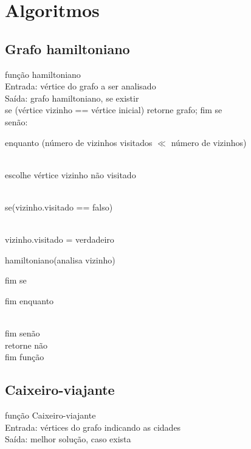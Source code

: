 \documentclass{article}
\begin{document}
\pagebreak

\section{Algoritmos}

\subsection{Grafo hamiltoniano}

função hamiltoniano\\
Entrada: vértice do grafo a ser analisado\\
Saída: grafo hamiltoniano, se existir\\

se (vértice vizinho == vértice inicial) retorne grafo; fim se\\

senão:

\hspace{\parindent}enquanto (número de vizinhos visitados $\ll$ número de vizinhos)\par\\
\hspace{6ex}escolhe vértice vizinho não visitado\par\\
\hspace{6ex}se(vizinho.visitado == falso)\par\\
\hspace{9ex}vizinho.visitado = verdadeiro\par
\hspace{9ex}hamiltoniano(analisa vizinho)\par
\hspace{6ex}fim se\par
\hspace{\parindent}fim enquanto\par\\
fim senão\\

retorne não\\
fim função

\subsection{Caixeiro-viajante}

função Caixeiro-viajante\\
Entrada: vértices do grafo indicando as cidades
\\Saída: melhor solução, caso exista\\
\end{document}
